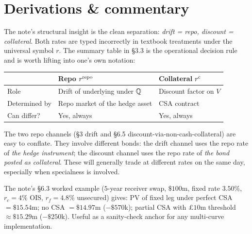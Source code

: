\documentclass[11pt,a4paper]{article}
\begin{document}
\section{Derivations \& commentary}

\begin{commentary}
The note's structural insight is the clean separation:
\emph{drift = repo, discount = collateral}. Both rates are typed
incorrectly in textbook treatments under the universal symbol $r$.
The summary table in \S3.3 is the operational decision rule and is
worth lifting into one's own notation:
\begin{center}
\begin{tabular}{@{}p{4cm}p{5cm}p{5cm}@{}}
\toprule
                  & Repo $r^{\mathrm{repo}}$                    & Collateral $r^{\mathrm{c}}$ \\
\midrule
Role              & Drift of underlying under $\mathbb{Q}$  & Discount factor on $V$ \\
Determined by     & Repo market of the hedge asset  & CSA contract \\
Can differ?       & Yes, always                     & Yes, always \\
\bottomrule
\end{tabular}
\end{center}
\end{commentary}

\begin{commentary}
The two repo channels (\S3 drift and \S6.5 discount-via-non-cash-collateral)
are easy to conflate. They involve different bonds: the drift channel
uses the repo rate of \emph{the hedge instrument}; the discount channel
uses the repo rate of \emph{the bond posted as collateral}. These will
generally trade at different rates on the same day, especially when
specialness is involved.
\end{commentary}

\begin{commentary}
The note's \S6.3 worked example ($5$-year receiver swap, $\$100$m,
fixed rate $3.50\%$, $r_c = 4\%$ OIS, $r_f = 4.8\%$ unsecured) gives:
PV of fixed leg under perfect CSA $= \$15.54$m; no CSA $= \$14.97$m
($-\$570$k); partial CSA with $\pounds 10$m threshold $\approx \$15.29$m
($-\$250$k). Useful as a sanity-check anchor for any multi-curve
implementation.
\end{commentary}

\end{document}
